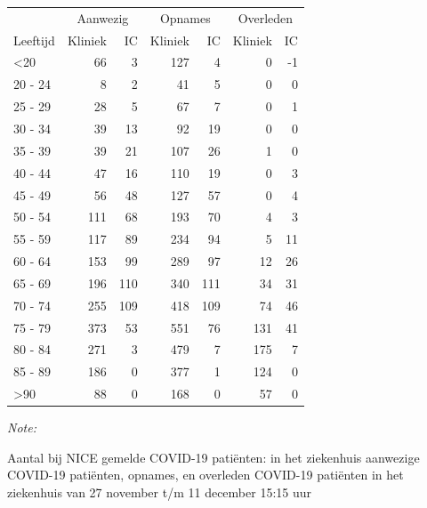 \documentclass[
  english,
  man,floatsintext]{apa6}
\begin{document}
\begin{table}
\centering\begingroup\fontsize{10}{12}\selectfont

\begin{threeparttable}
\begin{tabular}{lrrrrrr}
\toprule
\multicolumn{1}{c}{ } & \multicolumn{2}{c}{Aanwezig} & \multicolumn{2}{c}{Opnames} & \multicolumn{2}{c}{Overleden} \\
\cmidrule(l{3pt}r{3pt}){2-3} \cmidrule(l{3pt}r{3pt}){4-5} \cmidrule(l{3pt}r{3pt}){6-7}
Leeftijd & Kliniek & IC & Kliniek & IC & Kliniek & IC\\
\midrule
<20 & 66 & 3 & 127 & 4 & 0 & -1\\
20 - 24 & 8 & 2 & 41 & 5 & 0 & 0\\
25 - 29 & 28 & 5 & 67 & 7 & 0 & 1\\
30 - 34 & 39 & 13 & 92 & 19 & 0 & 0\\
35 - 39 & 39 & 21 & 107 & 26 & 1 & 0\\
40 - 44 & 47 & 16 & 110 & 19 & 0 & 3\\
45 - 49 & 56 & 48 & 127 & 57 & 0 & 4\\
50 - 54 & 111 & 68 & 193 & 70 & 4 & 3\\
55 - 59 & 117 & 89 & 234 & 94 & 5 & 11\\
60 - 64 & 153 & 99 & 289 & 97 & 12 & 26\\
65 - 69 & 196 & 110 & 340 & 111 & 34 & 31\\
70 - 74 & 255 & 109 & 418 & 109 & 74 & 46\\
75 - 79 & 373 & 53 & 551 & 76 & 131 & 41\\
80 - 84 & 271 & 3 & 479 & 7 & 175 & 7\\
85 - 89 & 186 & 0 & 377 & 1 & 124 & 0\\
>90 & 88 & 0 & 168 & 0 & 57 & 0\\
\bottomrule
\end{tabular}
\begin{tablenotes}
\item \textit{Note: } 
\item Aantal bij NICE gemelde COVID-19 patiënten: in het ziekenhuis aanwezige COVID-19 patiënten, opnames, en overleden COVID-19 patiënten in het ziekenhuis van 27 november t/m 11 december 15:15 uur
\end{tablenotes}
\end{threeparttable}
\endgroup{}
\end{table}

\newpage
\end{document}
